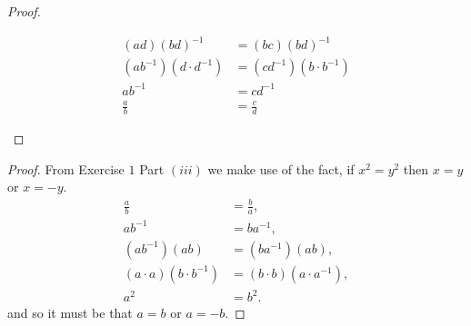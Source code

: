 \begin{exercise}[\textbf{3}]
\begin{enumerate}
\begin{proof}
\begin{itemize}
\begin{align*}
                     (ad)(bd)^{-1} &= (bc)(bd)^{-1} \\
                     (ab^{-1})(d\cdot d^{-1}) &= (cd^{-1})(b\cdot b^{-1}) \\
                     ab^{-1} &= cd^{-1} \\
                     \frac{a}{b} &= \frac{c}{d}
                 \end{align*} 
             \end{itemize}
         \end{proof}
         \begin{proof} From Exercise $1$ Part $(iii)$ we make use of the fact, if
          $x^2=y^2$ then $x=y$ or  $x=-y$.
              \begin{align*}
                  \frac{a}{b} &= \frac{b}{a}, \\
                  ab^{-1} &= ba^{-1}, \\
                  (ab^{-1})(ab) &= (ba^{-1})(ab), \\
                  (a\cdot a)(b\cdot b^{-1}) &= (b\cdot b)(a\cdot a^{-1}), \\
                  a^2 &= b^2.
              \end{align*}
              and so it must be that $a=b$ or $a=-b$.
         \end{proof}
     \end{enumerate}
\end{exercise}
\pagebreak
